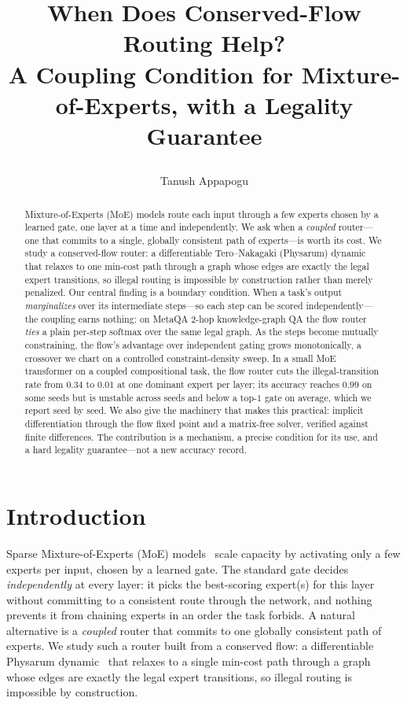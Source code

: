 \documentclass{article} %
\title{\raggedright When Does Conserved-Flow Routing Help? \\ A Coupling Condition for \mbox{Mixture-of-Experts}, with a Legality Guarantee}
\author{Tanush Appapogu}
\begin{document}
\maketitle

\begin{abstract}
Mixture-of-Experts (MoE) models route each input through a few experts chosen by a learned gate,
one layer at a time and independently. We ask when a \emph{coupled} router---one that commits to a
single, globally consistent path of experts---is worth its cost. We study a conserved-flow router:
a differentiable Tero--Nakagaki (Physarum) dynamic that relaxes to one min-cost path through a
graph whose edges are exactly the legal expert transitions, so illegal routing is impossible by
construction rather than merely penalized. Our central finding is a boundary condition. When a
task's output \emph{marginalizes} over its intermediate steps---so each step can be scored
independently---the coupling earns nothing: on MetaQA 2-hop knowledge-graph QA the flow router
\emph{ties} a plain per-step softmax over the same legal graph. As the steps become mutually
constraining, the flow's advantage over independent gating grows monotonically, a crossover we
chart on a controlled constraint-density sweep. In a small MoE transformer on a coupled
compositional task, the flow router cuts the illegal-transition rate from $0.34$ to $0.01$ at one
dominant expert per layer; its accuracy reaches $0.99$ on some seeds but is unstable across seeds and
below a top-$1$ gate on average, which we report seed by seed.
We also give the machinery that makes this practical: implicit differentiation through the flow
fixed point and a matrix-free solver, verified against finite differences. The contribution is a
mechanism, a precise condition for its use, and a hard legality guarantee---not a new accuracy
record.
\end{abstract}

\section{Introduction}
Sparse Mixture-of-Experts (MoE) models~\citep{shazeer2017,fedus2022switch} scale capacity by
activating only a few experts per input, chosen by a learned gate. The standard gate decides
\emph{independently} at every layer: it picks the best-scoring expert(s) for this layer without
committing to a consistent route through the network, and nothing prevents it from chaining experts
in an order the task forbids. A natural alternative is a \emph{coupled} router that commits to one
globally consistent path of experts. We study such a router built from a conserved flow: a
differentiable Physarum dynamic~\citep{tero2007,tero2010} that relaxes to a single min-cost path
through a graph whose edges are exactly the legal expert transitions, so illegal routing is
impossible by construction.
\end{document}
